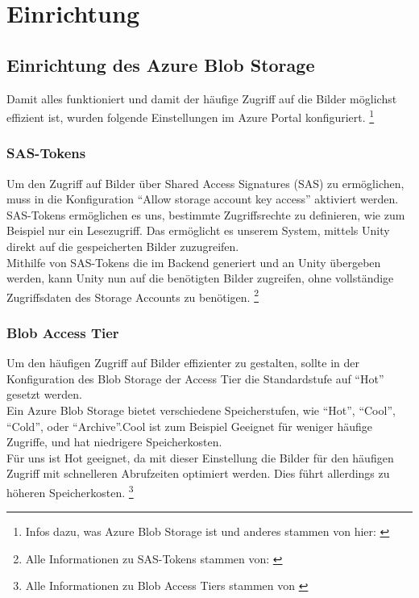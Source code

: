 
\section{Einrichtung}

\subsection{Einrichtung des Azure Blob Storage}

Damit alles funktioniert und damit der häufige Zugriff auf die Bilder
möglichst effizient ist, wurden folgende Einstellungen im Azure Portal
konfiguriert. \footnote{Infos dazu, was Azure Blob Storage ist und anderes stammen von hier: \cite{MicrosoftCorporationd}}

\subsubsection{SAS-Tokens}

Um den Zugriff auf Bilder über Shared Access Signatures (SAS) zu ermöglichen, muss in 
die Konfiguration ``Allow storage account key access'' aktiviert werden.
\\
SAS-Tokens ermöglichen es uns, bestimmte Zugriffsrechte zu definieren, wie zum Beispiel
nur ein Lesezugriff. Das ermöglicht es unserem System, mittels Unity direkt auf die
gespeicherten Bilder zuzugreifen.
\\
Mithilfe von SAS-Tokens die im Backend generiert und an Unity übergeben werden, 
kann Unity nun auf die benötigten Bilder zugreifen, ohne vollständige Zugriffsdaten 
des Storage Accounts zu benötigen. \footnote{Alle Informationen zu SAS-Tokens stammen von: \cite{MicrosoftCorporationa}}


\subsubsection{Blob Access Tier}

Um den häufigen Zugriff auf Bilder effizienter zu gestalten, sollte in der Konfiguration 
des Blob Storage der Access Tier die Standardstufe auf ``Hot'' gesetzt werden.
\\
Ein Azure Blob Storage bietet verschiedene Speicherstufen, wie ``Hot'', ``Cool'', ``Cold'',
oder ``Archive''.Cool ist zum Beispiel Geeignet für weniger häufige Zugriffe, und hat
niedrigere Speicherkosten. 
\\
Für uns ist Hot geeignet, da mit dieser Einstellung die Bilder
für den häufigen Zugriff mit schnelleren Abrufzeiten optimiert werden. Dies führt allerdings
zu höheren Speicherkosten. \footnote{Alle Informationen zu Blob Access Tiers stammen von \cite{MicrosoftCorporationb}}


